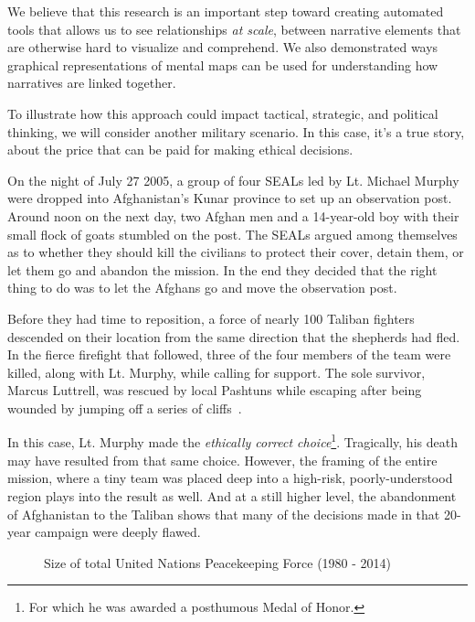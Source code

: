 \documentclass[11pt,dvipdfm]{article}
\begin{document}
We believe that this research is an important step toward creating automated tools that allows us to see relationships \textit{at scale}, between narrative elements that are otherwise hard to visualize and comprehend. We also demonstrated ways graphical representations of mental maps can be used for understanding how narratives are linked together.

To illustrate how this approach could impact tactical, strategic, and political thinking, we will consider another military scenario. In this case, it's a true story, about the price that can be paid for making ethical decisions.

On the night of July 27 2005, a group of four SEALs led by Lt. Michael Murphy were dropped into Afghanistan's Kunar province to set up an observation post. Around noon on the next day, two Afghan men and a 14-year-old boy with their small flock of goats stumbled on the post. The SEALs argued among themselves as to whether they should kill the civilians to protect their cover, detain them, or let them go and abandon the mission. In the end they decided that the right thing to do was to let the Afghans go and move the observation post. 

Before they had time to reposition, a force of nearly 100 Taliban fighters descended on their location from the same direction that the shepherds had fled. In the fierce firefight that followed, three of the four members of the team were killed, along with Lt. Murphy, while calling for support. The sole survivor, Marcus Luttrell, was rescued by local Pashtuns while escaping after being wounded by jumping off a series of cliffs~\cite{lucas2009not}.

In this case, Lt. Murphy made the \textit{ethically correct choice}\footnote{For which he was awarded a posthumous Medal of Honor.}.  Tragically, his death may have resulted from that same choice. However, the framing of the entire mission, where a tiny team was placed deep into a high-risk, poorly-understood region plays into the result as well. And at a still higher level, the abandonment of Afghanistan to the Taliban shows that many of the decisions made in that 20-year campaign were deeply flawed.

\begin{figure}[!htbp]
	\centering
	\caption{\label{fig:UN_peackeeping} Size of total United Nations Peacekeeping Force (1980 - 2014)}
\end{figure}
\end{document}
